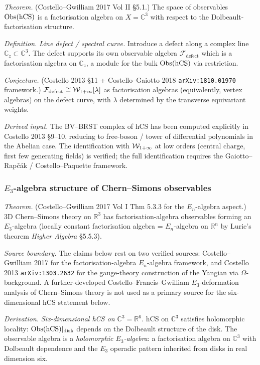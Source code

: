 \emph{Theorem.} (Costello--Gwilliam 2017 Vol II §5.1.)
The space of observables $\mathrm{Obs}(\mathrm{hCS})$ is a factorisation algebra on $X = \mathbb{C}^3$
with respect to the Dolbeault-factorisation structure.

\emph{Definition.} \emph{Line defect / spectral curve.}
Introduce a defect along a complex line $\mathbb{C}_z \subset \mathbb{C}^3$. The defect
supports its own observable algebra $\mathcal{F}_{\mathrm{defect}}$ which is a
factorisation algebra on $\mathbb{C}_z$, a module for the bulk $\mathrm{Obs}(\mathrm{hCS})$ via
restriction.

\emph{Conjecture.} (Costello 2013 §11 + Costello--Gaiotto 2018
\texttt{arXiv:1810.01970} framework.)
$\mathcal{F}_{\mathrm{defect}} \cong \mathcal{W}_{1+\infty}[\lambda]$ as factorisation algebras
(equivalently, vertex algebras) on the defect curve, with $\lambda$ determined by
the transverse equivariant weights.

\emph{Derived input.} The BV--BRST complex of hCS has been computed explicitly
in Costello 2013 §9--10, reducing to free-boson / tower of differential
polynomials in the Abelian case. The identification with $\mathcal{W}_{1+\infty}$ at low orders
(central charge, first few generating fields) is verified; the full identification
requires the Gaiotto--Rapčák / Costello--Paquette framework.

\subsubsection{$E_3$-algebra structure of Chern--Simons observables}
\label{wn:subsubsec:E3-CS-2026}

\emph{Theorem.} (Costello--Gwilliam 2017 Vol I Thm 5.3.3 for the $E_n$-algebra
aspect.) 3D Chern--Simons theory on $\mathbb{R}^3$ has factorisation-algebra observables
forming an $E_3$-algebra (locally constant factorisation algebra = $E_n$-algebra on
$\mathbb{R}^n$ by Lurie's theorem \emph{Higher Algebra} §5.5.3).

\emph{Source boundary.} The claims below rest on two verified sources: Costello--Gwilliam 2017
for the factorisation-algebra $E_n$-algebra framework, and Costello 2013
\texttt{arXiv:1303.2632} for the gauge-theory construction of the Yangian via
$\Omega$-background. A further-developed Costello--Francis--Gwilliam $E_3$-deformation
analysis of Chern--Simons theory is not used as a primary source for the
six-dimensional hCS statement below.

\emph{Derivation.} \emph{Six-dimensional hCS on $\mathbb{C}^3 = \mathbb{R}^6$.}
hCS on $\mathbb{C}^3$ satisfies holomorphic locality: $\mathrm{Obs}(\mathrm{hCS})|_{\mathrm{disk}}$
depends on the Dolbeault structure of the disk.
The observable algebra is a \emph{holomorphic $E_3$-algebra}: a
factorisation algebra on $\mathbb{C}^3$ with Dolbeault dependence and
the $E_3$ operadic pattern inherited from disks in real dimension six.

